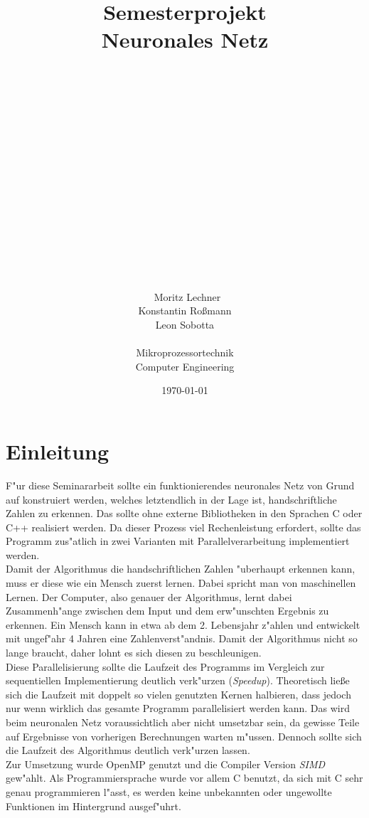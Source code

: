 \documentclass[12pt,a4paper]{scrartcl}
\title{Semesterprojekt \\ Neuronales Netz}
\author{\\\\\\\\\\\\\\\\\\\\\\\\\\\\\\\\\
  Moritz Lechner\\
  Konstantin Ro\ss mann\\
  Leon Sobotta\\\\
  Mikroprozessortechnik\\
  Computer Engineering
}
\date{\today}
\begin{document}
\maketitle

\pagebreak

\tableofcontents
\listoffigures	

\pagebreak


\section{Einleitung}

F"ur diese Seminararbeit sollte ein funktionierendes neuronales Netz von Grund auf konstruiert werden, welches letztendlich in der Lage ist, handschriftliche Zahlen zu erkennen. Das sollte ohne externe Bibliotheken in den Sprachen C oder C++ realisiert werden. Da dieser Prozess viel Rechenleistung erfordert, sollte das Programm zus"atlich in zwei Varianten mit Parallelverarbeitung implementiert werden.\\

Damit der Algorithmus die handschriftlichen Zahlen "uberhaupt erkennen kann, muss er diese wie ein Mensch zuerst lernen. Dabei spricht man von maschinellen Lernen. Der Computer, also genauer der Algorithmus, lernt dabei Zusammenh"ange zwischen dem Input und dem erw"unschten Ergebnis zu erkennen. Ein Mensch kann in etwa ab dem 2. Lebensjahr  z"ahlen und entwickelt mit ungef"ahr 4 Jahren eine Zahlenverst"andnis. Damit der Algorithmus nicht so lange braucht, daher lohnt es sich diesen zu beschleunigen. \\

Diese Parallelisierung sollte die Laufzeit des Programms im Vergleich zur sequentiellen Implementierung deutlich verk"urzen (\textit{Speedup}). Theoretisch lie\ss e sich die Laufzeit mit doppelt so vielen genutzten Kernen halbieren, dass jedoch nur wenn wirklich das gesamte Programm parallelisiert werden kann. Das wird beim neuronalen Netz voraussichtlich aber nicht umsetzbar sein, da gewisse Teile auf Ergebnisse von vorherigen Berechnungen warten m"ussen. Dennoch sollte sich die Laufzeit des Algorithmus deutlich verk"urzen lassen.\\

Zur Umsetzung wurde OpenMP genutzt und die Compiler Version \textit{SIMD} gew"ahlt. Als Programmiersprache wurde vor allem C benutzt, da sich mit C sehr genau programmieren l"asst, es werden keine unbekannten oder ungewollte Funktionen im Hintergrund ausgef"uhrt. 
\end{document}
